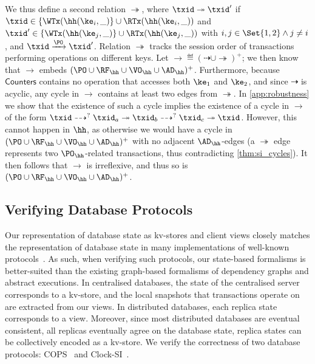 We thus define a second relation $\twoheadrightarrow$, where
$\txid \twoheadrightarrow \txid'$ if $\txid \in \{\WTx(\hh(\ke_{i}, \_)\} \cup \RTx(\hh(\ke_{i}, \_))$ 
and $\txid' \in \{\WTx(\hh(\ke_{j}, \_)\} \cup \RTx(\hh(\ke_{j}, \_))$ with $i,j \in \Set{1,2} \land j \neq i$,  
and $\txid \xrightarrow{\PO} \txid'$.
Relation $\twoheadrightarrow$ tracks the session order of transactions performing operations on different keys. 
Let $\rightarrow \eqdef (\dashrightarrow \cup \twoheadrightarrow)^{+}$; 
we then know that $\rightarrow$ embeds $(\PO \cup \RF_{\hh} \cup \VO_{\hh} \cup \AD_{\hh})^{+}$.
Furthermore, because $\mathsf{Counters}$ contains no operation that accesses both $\ke_1$ and $\ke_2$, and since $\dashrightarrow$ is acyclic, 
any cycle in $\rightarrow$ contains at least two edges from $\twoheadrightarrow$. 
In \cref{app:robustness} we show that the existence of such a cycle implies the 
existence of a cycle in $\rightarrow$ of the form $\txid \dashrightarrow^{?} \txid_{a} \twoheadrightarrow 
\txid_{b} \dashrightarrow^{?} \txid_{c} \twoheadrightarrow \txid$. 
However, this cannot happen in $\hh$, as otherwise we would have a cycle in $(\PO \cup \RF_{\hh} \cup \VO_{\hh} \cup \AD_{\hh})^{+}$ with no adjacent $\AD_{\hh}$-edges (a $\twoheadrightarrow$ edge represents two  $\PO_{\hh}$-related transactions, 
thus contradicting \cref{thm:si_cycles}). 
It then follows that $\rightarrow$ is irreflexive, and thus so is $(\PO \cup \RF_{\hh} \cup \VO_{\hh} \cup \AD_{\hh})^+$.

\vspace*{-7pt}
\subsection{Verifying Database Protocols}
\vspace*{-7pt}
\label{sec:verify-impl}
%
Our representation of database state as kv-stores and client views closely matches the representation of database state in many implementations of 
well-known protocols~\cite{ramp,rola,cops,wren,redblue,PSI,NMSI,gdur,clocksi,distrsi}.
As such, when verifying such protocols, our state-based formalisms is better-suited than the existing graph-based formalisms of dependency graphs and abstract executions. 
In centralised databases, the state of the centralised server corresponds to a kv-store,
and the local snapshots that transactions operate on are extracted from our views.  
In distributed databases, each replica state corresponds to a view. 
Moreover, since most distributed databases are eventual consistent, 
\ie all replicas eventually agree on the database state,
replica states can be collectively encoded as a kv-store.
We verify the correctness of two database protocols:
COPS~\cite{cops} and Clock-SI~\cite{clocksi}.

